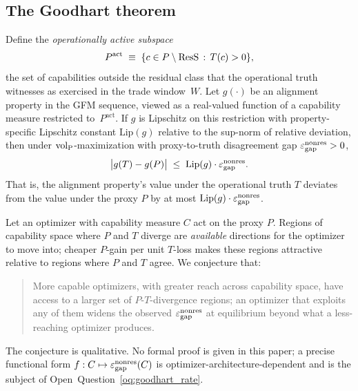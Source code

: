 \subsection{The Goodhart theorem}
\label{sec:goodhart_theorem}

\begin{theorem}
\label{thm:goodhart}
Define the \emph{operationally active subspace}
\[
  P^{\mathrm{act}} \;\equiv\; \{c \in P \setminus \mathrm{ResS} \,:\, T(c) > 0\},
\]
the set of capabilities outside the residual class that the
operational truth witnesses as exercised in the trade window~$W$.
Let $g(\cdot)$ be an alignment property in the GFM sequence,
viewed as a real-valued function of a capability measure
restricted to~$P^{\mathrm{act}}$.  If $g$ is Lipschitz on this
restriction with property-specific Lipschitz constant
$\mathrm{Lip}(g)$ relative to the sup-norm of relative deviation,
then under ${\operatorname{vol}_{\mathrm{P}}}$-maximization with proxy-to-truth disagreement
gap $\varepsilon_{\mathrm{gap}}^{\mathrm{nonres}} > 0$,
\[
  \bigl| g(T) - g(P) \bigr| \;\leq\; \mathrm{Lip}(g) \cdot \varepsilon_{\mathrm{gap}}^{\mathrm{nonres}}.
\]
That is, the alignment property's value under the operational
truth $T$ deviates from the value under the proxy $P$ by at most
$\mathrm{Lip}(g) \cdot \varepsilon_{\mathrm{gap}}^{\mathrm{nonres}}$.
\end{theorem}

\begin{conjecture}
\label{conj:optimization_pressure}
Let an optimizer with capability measure $C$ act on the proxy
$P$.  Regions of capability space where $P$ and $T$ diverge are
\emph{available} directions for the optimizer to move into;
cheaper $P$-gain per unit $T$-loss makes these regions attractive
relative to regions where $P$ and $T$ agree.  We conjecture that:
\begin{quote}
More capable optimizers, with greater reach across capability
space, have access to a larger set of $P$-$T$-divergence regions;
an optimizer that exploits any of them widens the observed
$\varepsilon_{\mathrm{gap}}^{\mathrm{nonres}}$ at equilibrium beyond what a less-reaching optimizer
produces.
\end{quote}
The conjecture is qualitative.  No formal proof is given in this
paper; a precise functional form $f: C \mapsto \varepsilon_{\mathrm{gap}}^{\mathrm{nonres}}(C)$ is
optimizer-architecture-dependent and is the subject of
Open~Question~\ref{oq:goodhart_rate}.
\end{conjecture}

